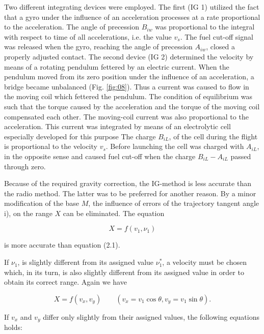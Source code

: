 \documentclass[12pt, a4paper]{article}
\begin{document}
\begin{enumerate}
Two different integrating devices were employed. The first (IG 1) utilized the fact that a gyro under the influence of an acceleration processes at a rate proportional to the acceleration. The angle of precession $B_{iw}$ was proportional to the integral with respect to time of all accelerations, i.e. the value $v_{s}$. The fuel cut-off signal was released when the gyro, reaching the angle of precession $A_{iw}$, closed a properly adjusted contact. The second device (IG 2) determined the velocity by means of a rotating pendulum fettered by an electric current. When the pendulum moved from its zero position under the influence of an acceleration, a bridge became unbalanced (Fig. \ref{fig:08}). Thus a current was caused to flow in the moving coil which fettered the pendulum. The condition of equilibrium was such that the torque caused by the acceleration and the torque of the moving coil compensated each other. The moving-coil current was also proportional to the acceleration. This current was integrated by means of an electrolytic cell especially developed for this purpose The charge $B_{iL}$, of the cell during the flight is proportional to the velocity $v_{s}$. Before launching the cell was charged with $A_{iL}$, in the opposite sense and caused fuel cut-off when the charge $B_{iL}-A_{iL}$ passed through zero.

Because of the required gravity correction, the IG-method is less accurate than the radio method. The latter was to be preferred for another reason. By a minor modification of the base $M$, the influence of errors of the trajectory tangent angle i), on the range $X$ can be eliminated. The equation

\begin{equation}
  X=f(v_{1}, \nu_{1})
\end{equation}

is more accurate than equation (2.1).

If $\nu_{1}$, is slightly different from its assigned value  $\nu_{1}^{*}$, a velocity must be chosen which, in its turn, is also slightly different from its assigned value in order to obtain its correct range. Again we have

\begin{equation}
  X=f(v_{x}, v_{y})\quad\quad(v_{x}=v_{1}\cos{\theta}, v_{y}=v_{1}\sin{\theta}).
\end{equation}

If $v_{x}$ and $v_{y}$ differ only slightly from their assigned values, the following
equations holds:


\end{enumerate}
\end{document}
